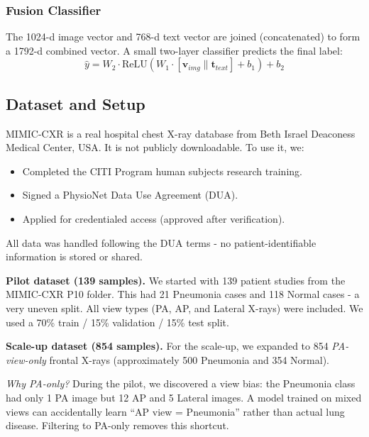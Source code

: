 \documentclass{article}
\begin{document}
\subsubsection{Fusion Classifier}

The 1024-d image vector and 768-d text vector are joined (concatenated)
to form a 1792-d combined vector. A small two-layer classifier predicts
the final label:
\begin{equation}
  \hat{y} = W_2 \cdot \text{ReLU}(W_1 \cdot [\mathbf{v}_{img} \| \mathbf{t}_{text}] + b_1) + b_2
  \label{eq:fusion}
\end{equation}

\subsection{Dataset and Setup}

\begin{tcolorbox}[colback=blue!4!white, colframe=blue!55!black,
                  title=Dataset Access - MIMIC-CXR-JPG (Restricted),
                  fonttitle=\small\bfseries]
\small
MIMIC-CXR is a real hospital chest X-ray database from Beth Israel Deaconess
Medical Center, USA. It is not publicly downloadable. To use it, we:
\begin{itemize}[noitemsep]
  \item Completed the CITI Program human subjects research training.
  \item Signed a PhysioNet Data Use Agreement (DUA).
  \item Applied for credentialed access (approved after verification).
\end{itemize}
All data was handled following the DUA terms - no patient-identifiable
information is stored or shared.
\end{tcolorbox}

\textbf{Pilot dataset (139 samples).}
We started with 139 patient studies from the MIMIC-CXR P10 folder.
This had 21 Pneumonia cases and 118 Normal cases - a very uneven split.
All view types (PA, AP, and Lateral X-rays) were included.
We used a 70\% train / 15\% validation / 15\% test split.

\textbf{Scale-up dataset (854 samples).}
For the scale-up, we expanded to 854 \emph{PA-view-only} frontal X-rays
(approximately 500 Pneumonia and 354 Normal).

\noindent\textit{Why PA-only?} During the pilot, we discovered a view bias:
the Pneumonia class had only 1 PA image but 12 AP and 5 Lateral images.
A model trained on mixed views can accidentally learn ``AP view = Pneumonia''
rather than actual lung disease. Filtering to PA-only removes this shortcut.
\end{document}
